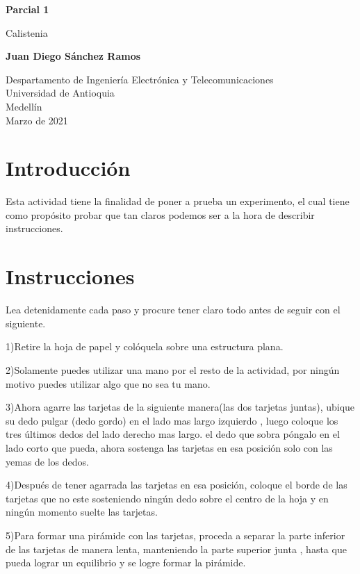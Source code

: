 \documentclass{article}
\begin{document}
\begin{titlepage}
    \begin{center}
        \vspace*{1cm}
            
        \Huge
        \textbf{  Parcial 1  }
            
        \vspace{0.5cm}
        \LARGE
    Calistenia
            
        \vspace{1.5cm}
            
        \textbf{Juan Diego Sánchez Ramos}
            
        \vfill
            
        \vspace{0.8cm}
            
        \Large
        Despartamento de Ingeniería Electrónica y Telecomunicaciones\\
        Universidad de Antioquia\\
        Medellín\\
        Marzo de 2021
            
    \end{center}
\end{titlepage}

\tableofcontents
\newpage
\section{Introducción}\label{intro}
Esta actividad tiene la finalidad de poner a prueba un experimento, el cual tiene como propósito probar que tan claros podemos ser a la hora de describir instrucciones. 
\newpage

\section{Instrucciones}\label{contenido}
Lea detenidamente cada paso y procure tener claro todo antes de seguir con el siguiente.

1)Retire la hoja de papel y colóquela sobre una estructura plana.

2)Solamente puedes utilizar una mano por el resto de la actividad, por ningún motivo puedes utilizar algo que no sea tu mano.

3)Ahora agarre las tarjetas de la siguiente manera(las dos tarjetas juntas), ubique su dedo pulgar (dedo gordo) en el lado mas largo izquierdo , luego coloque los tres últimos dedos del lado derecho mas largo. el dedo que sobra póngalo en el lado corto que pueda, ahora sostenga las tarjetas en esa posición solo con las yemas de los dedos.

4)Después de tener agarrada las tarjetas en esa posición, coloque el borde de las tarjetas que no este sosteniendo ningún dedo sobre el centro de la hoja y en ningún momento suelte las tarjetas.

5)Para formar una pirámide con las tarjetas, proceda a separar la parte inferior de las tarjetas  de manera lenta, manteniendo la parte superior junta , hasta que pueda lograr un equilibrio y se logre formar la pirámide.
\end{document}
